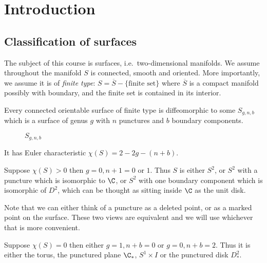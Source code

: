 \documentclass[a4paper]{article}
\begin{document}


\tableofcontents

\setcounter{section}{-1}

\section{Introduction}

\subsection{Classification of surfaces}

The subject of this course is surfaces, i.e.\ two-dimensional manifolds. We assume throughout the manifold \(S\) is connected, smooth and oriented. More importantly, we assume it is of \emph{finite type}: \(S = \overline S - \{\text{finite set}\}\) where \(\overline S\) is a compact manifold possibly with boundary, and the finite set is contained in its interior.

\begin{theorem}
  Every connected orientable surface of finite type is diffeomorphic to some \(S_{g, n, b}\) which is a surface of genus \(g\) with \(n\) punctures and \(b\) boundary components.
\end{theorem}

\begin{figure}[ht]
  \centering
  \def\svgwidth{.8\columnwidth}
  
  \caption{\(S_{g, n, b}\)}
\end{figure}

It has Euler characteristic \(\chi(S) = 2 - 2g - (n + b)\).

\begin{eg}
  Suppose \(\chi(S) > 0\) then \(g = 0, n + 1 = 0 \text{ or } 1\). Thus \(S\) is either \(S^2\), or \(S^2\) with a puncture which is isomorphic to \(\C\), or \(S^2\) with one boundary component which is isomorphic of \(D^2\), which can be thought as sitting inside \(\C\) as the unit disk.

  Note that we can either think of a puncture as a deleted point, or as a marked point on the surface. These two views are equivalent and we will use whichever that is more convenient.
\end{eg}

\begin{eg}
  Suppose \(\chi(S) = 0\) then either \(g = 1, n + b = 0\) or \(g = 0, n + b = 2\). Thus it is either the torus, the punctured plane \(\C_*\), \(S^1 \times I\) or the punctured disk \(D^2_*\).
\end{eg}
\end{document}
